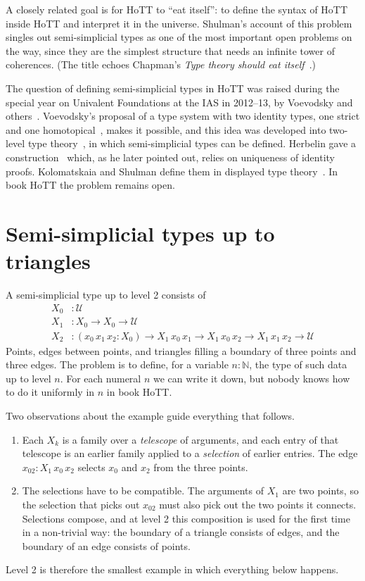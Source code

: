 \documentclass[11pt]{article}
\begin{document}
A closely related goal is for HoTT to ``eat itself'': to define the syntax of
HoTT inside HoTT and interpret it in the universe. Shulman's account of this
problem~\cite{shulman-eat} singles out semi-simplicial types as one of the
most important open problems on the way, since they are the simplest
structure that needs an infinite tower of coherences. (The title echoes
Chapman's \emph{Type theory should eat itself}~\cite{chapman}.)

The question of defining semi-simplicial types in HoTT was raised during the
special year on Univalent Foundations at the IAS in 2012--13, by Voevodsky
and others~\cite{ufias-sst}. Voevodsky's proposal of a type system with two
identity types, one strict and one homotopical~\cite{voevodsky-hts}, makes
it possible, and this idea was developed into two-level type
theory~\cite{ack-strict,acks-2ltt}, in which semi-simplicial types can be
defined. Herbelin gave a construction~\cite{herbelin} which, as he later
pointed out, relies on uniqueness of identity proofs. Kolomatskaia and
Shulman define them in displayed type theory~\cite{dtt}. In book HoTT the
problem remains open.

\section{Semi-simplicial types up to triangles}

A semi-simplicial type up to level 2 consists of
\begin{align*}
X_0 &: \mathcal U\\
X_1 &: X_0 \to X_0 \to \mathcal U\\
X_2 &: (x_0\,x_1\,x_2 : X_0) \to X_1\,x_0\,x_1 \to X_1\,x_0\,x_2 \to X_1\,x_1\,x_2 \to \mathcal U
\end{align*}
Points, edges between points, and triangles filling a boundary of three
points and three edges. The problem is to define, for a variable $n:\mathbb N$,
the type of such data up to level $n$. For each numeral $n$ we can write it
down, but nobody knows how to do it uniformly in $n$ in book HoTT.

Two observations about the example guide everything that follows.
\begin{enumerate}
\item Each $X_k$ is a family over a \emph{telescope} of arguments, and each
  entry of that telescope is an earlier family applied to a \emph{selection}
  of earlier entries. The edge $x_{02} : X_1\,x_0\,x_2$ selects $x_0$ and
  $x_2$ from the three points.
\item The selections have to be compatible. The arguments of $X_1$ are two
  points, so the selection that picks out $x_{02}$ must also pick out the two
  points it connects. Selections compose, and at level 2 this composition is
  used for the first time in a non-trivial way: the boundary of a triangle
  consists of edges, and the boundary of an edge consists of points.
\end{enumerate}
Level 2 is therefore the smallest example in which everything below happens.
\end{document}
